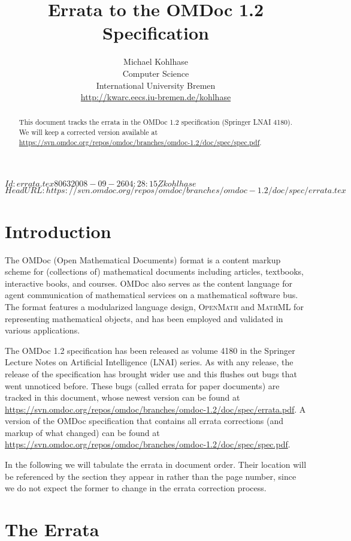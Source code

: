 \documentclass{article}
\title{Errata to the OMDoc 1.2 Specification}
\author{Michael Kohlhase\\
  Computer Science\\
  International University Bremen\\
  \url{http://kwarc.eecs.iu-bremen.de/kohlhase}}
\def\omdoc{OMDoc}
\def\mathml{\scshape{MathML}}
\def\openmath{\scshape{OpenMath}}
\begin{document}
\maketitle
\svnInfo $Id: errata.tex 8063 2008-09-26 04:28:15Z kohlhase $
\svnKeyword $HeadURL: https://svn.omdoc.org/repos/omdoc/branches/omdoc-1.2/doc/spec/errata.tex $
\begin{abstract}
  This document tracks the errata in the OMDoc 1.2 specification (Springer LNAI 4180). We
  will keep a corrected version available at
  \url{https://svn.omdoc.org/repos/omdoc/branches/omdoc-1.2/doc/spec/spec.pdf}.
\end{abstract}

\section{Introduction}
The {\omdoc} (Open Mathematical Documents) format is a content markup scheme for
(collections of) mathematical documents including articles, textbooks, interactive books,
and courses.  {\omdoc} also serves as the content language for agent communication of
mathematical services on a mathematical software bus.  The format features a modularized
language design, {\openmath} and {\mathml} for representing mathematical objects, and has
been employed and validated in various applications.

The {\omdoc} 1.2 specification has been released as volume 4180 in the Springer Lecture
Notes on Artificial Intelligence (LNAI) series. As with any release, the release of the
specification has brought wider use and this flushes out bugs that went unnoticed before.
These bugs (called errata for paper documents) are tracked in this document, whose newest
version can be found at
\url{https://svn.omdoc.org/repos/omdoc/branches/omdoc-1.2/doc/spec/errata.pdf}. A
version of the OMDoc specification that contains all errata corrections (and markup of
what changed) can be found at
\url{https://svn.omdoc.org/repos/omdoc/branches/omdoc-1.2/doc/spec/spec.pdf}.

In the following we will tabulate the errata in document order. Their location will be
referenced by the section they appear in rather than the page number, since we do not
expect the former to change in the errata correction process.
\newpage
\section{The Errata}

\newpage
\end{document}
